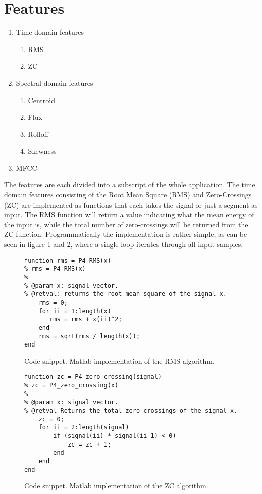 \section{Features}

\begin{enumerate}
	\item Time domain features
	\begin{enumerate}
		\item RMS
		\item ZC
	\end{enumerate}
	\item Spectral domain features
	\begin{enumerate}
		\item Centroid
		\item Flux
		\item Rolloff
		\item Skewness
	\end{enumerate}
	\item MFCC
\end{enumerate}

The features are each divided into a subscript of the whole application. The time domain features consisting of the Root Mean Square (RMS) and Zero-Crossings (ZC) are implemented as functions that each takes the signal or just a segment as input. The RMS function will return a value indicating what the mean energy of the input is, while the total number of zero-crossings will be returned from the ZC function. Programmatically the implementation is rather simple, as can be seen in figure \ref{snippet-RMS} and \ref{snippet-ZC}, where a single loop iterates through all input samples.

\begin{figure}
\begin{lstlisting}
function rms = P4_RMS(x)
% rms = P4_RMS(x)
%
% @param x: signal vector.
% @retval: returns the root mean square of the signal x.
    rms = 0;
    for ii = 1:length(x)
       rms = rms + x(ii)^2; 
    end
    rms = sqrt(rms / length(x));
end
\end{lstlisting}
\caption{Code snippet. Matlab implementation of the RMS algorithm.}
\label{snippet-RMS}
\end{figure}

\begin{figure}
\begin{lstlisting}
function zc = P4_zero_crossing(signal)
% zc = P4_zero_crossing(x)
%
% @param x: signal vector.
% @retval Returns the total zero crossings of the signal x.
    zc = 0;
    for ii = 2:length(signal)
        if (signal(ii) * signal(ii-1) < 0)
            zc = zc + 1;
        end
    end
end
\end{lstlisting}
\caption{Code snippet. Matlab implementation of the ZC algorithm.}
\label{snippet-ZC}
\end{figure}